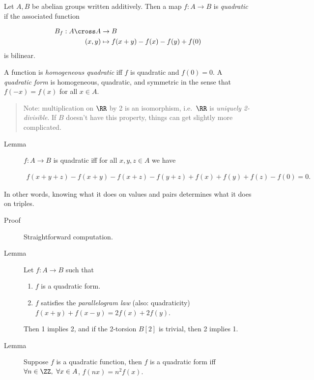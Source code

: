 Let \(A, B\) be abelian groups written additively. Then a map
\(f: A\to B\) is \emph{quadratic} if the associated function

\begin{align*}
B_f: A\cross A &\to B \\
(x, y) &\mapsto f(x+y) - f(x) - f(y) + f(0)
\end{align*} is bilinear.

A function is \emph{homogeneous quadratic} iff \(f\) is quadratic and
\(f(0)= 0\). A \emph{quadratic form} is homogeneous, quadratic, and
symmetric in the sense that \(f(-x) = f(x)\) for all \(x\in A\).

\begin{quote}
Note: multiplication on \(\RR\) by 2 is an isomorphism, i.e.~\(\RR\) is
\emph{uniquely 2-divisible}. If \(B\) doesn't have this property, things
can get slightly more complicated.
\end{quote}

\begin{description}
\item[Lemma]
\(f: A\to B\) is quadratic iff for all \(x, y, z\in A\) we have

\begin{align*}
f(x + y + z) - f(x + y) - f(x + z) - f(y+z) + f(x) + f(y) + f(z) - f(0) = 0
.\end{align*}
\end{description}

In other words, knowing what it does on values and pairs determines what
it does on triples.

\begin{description}
\item[Proof]
Straightforward computation.
\item[Lemma]
Let \(f:A\to B\) such that

\begin{enumerate}
\def\labelenumi{\arabic{enumi}.}
\tightlist
\item
  \(f\) is a quadratic form.
\item
  \(f\) satisfies the \emph{parallelogram law} (also: quadraticity)
  \(f(x + y) + f(x-y) = 2f(x) + 2f(y)\).
\end{enumerate}

Then 1 implies 2, and if the 2-torsion \(B[2]\) is trivial, then 2
implies 1.
\item[Lemma]
Suppose \(f\) is a quadratic function, then \(f\) is a quadratic form
iff \(\forall n\in \ZZ,~\forall x\in A\), \(f(nx) = n^2f(x)\).
\end{description}

